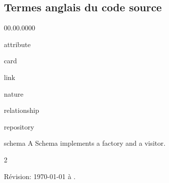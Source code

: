 \documentclass[11pt,french]{article}
\begin{document}
\subsection{Termes anglais du code source }

\begin{multicols}{3}
\begin{lyxlist}{00.00.0000}
\item [{attribute}] 
\item [{card}] 
\item [{link}] 
\item [{nature}] 
\item [{relationship}] 
\item [{repository}] 
\item [{schema}] A Schema implements a factory and a visitor. 
\end{lyxlist}
\end{multicols}{2}

\vfill\tiny\center
{}
Révision: \today{} à \currenttime.
\end{document}
